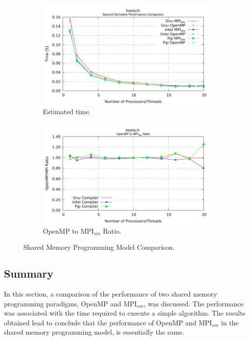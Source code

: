 \begin{figure} [t!]
    \centering
    \captionsetup{justification=centering, singlelinecheck=false}
    \begin{subfigure}{.6\textwidth}
      \centering
      \hspace*{-1.5cm} 
      \includegraphics[width=0.95\linewidth]{Plots/SMPM/koelsch.pdf}
      \caption[]{Estimated time.}
      \label{fig:sharedMemoryComparison3}
    \end{subfigure}%
    \begin{subfigure}{.6\textwidth}
      \centering
      \hspace*{-1.5cm} 
      \includegraphics[width=0.95\linewidth]{Plots/SMPM/koelschRatio.pdf}
      \caption{OpenMP to MPI$_{sm}$ Ratio.}
      \label{fig:sharedMemoryRatioComparison3}
    \end{subfigure}%
\caption{Shared Memory Programming Model Comparison.}
\label{fig:sharedMemoryProgrammingModel3}
\end{figure}




\subsection*{Summary}

In this section, a comparison of the performance of two shared memory programming paradigms, OpenMP and MPI$_{sm}$, was discussed. The performance was associated with the time required to execute a simple algorithm. The results obtained lead to conclude that the performance of OpenMP and MPI$_{sm}$ in the shared memory programming model, is essentially the same.
